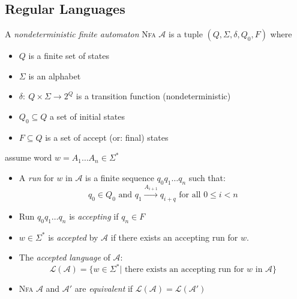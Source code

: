 \documentclass[a4paper, 10pt]{article}
\begin{document}
\subsection*{Regular Languages}
\begin{shaded}
    A \emph{nondeterministic finite automaton} \textsc{Nfa} $\mathcal{A}$ is a tuple $(Q,\Sigma,\delta,Q_0,F)$ where
    \begin{itemize}
        \item $Q$ is a finite set of states
        \item $\Sigma$ is an alphabet
        \item $\delta:\ Q\times\Sigma\to2^Q$ is a transition function (nondeterministic)
        \item $Q_0\subseteq Q$ a set of initial states
        \item $F\subseteq Q$ is a set of accept (or: final) states
    \end{itemize}
    assume word $w=A_1\dots A_n\in\Sigma^*$
    \begin{itemize}
        \item A \emph{run} for $w$ in $\mathcal{A}$ is a finite sequence $q_0q_1\dots q_n$ such that:
        \[ q_0\in Q_0 \textrm{ and } q_1\overset{A_{i+1}}{\longrightarrow} q_{i+q} \textrm{ for all } 0\leq i < n \]
        \item Run $q_0q_1\dots q_n$ is \emph{accepting} if $q_n\in F$
        \item $w\in\Sigma^*$ is \emph{accepted} by $\mathcal{A}$ if there exists an accepting run for $w$.
        \item The \emph{accepted language} of $\mathcal{A}$: \[ \mathcal{L}(\mathcal{A})=\{ w\in\Sigma^* | \textrm{ there exists an accepting run for } w \textrm{ in } \mathcal{A} \} \]
        \item \textsc{Nfa} $\mathcal{A}$ and $\mathcal{A}'$ are \emph{equivalent} if $\mathcal{L}(\mathcal{A})=\mathcal{L}(\mathcal{A}')$
    \end{itemize}
\end{shaded}
\end{document}

